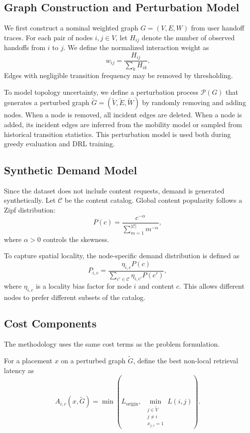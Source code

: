 \subsection{Graph Construction and Perturbation Model}

We first construct a nominal weighted graph \(G=(V,E,W)\) from user handoff traces. For each pair of nodes \(i,j \in V\), let \(H_{ij}\) denote the number of observed handoffs from \(i\) to \(j\). We define the normalized interaction weight as
\[
w_{ij} = \frac{H_{ij}}{\sum_{k} H_{ik}}.
\]
Edges with negligible transition frequency may be removed by thresholding.

To model topology uncertainty, we define a perturbation process \(\mathcal{P}(G)\) that generates a perturbed graph \(\tilde{G} = (\tilde{V}, \tilde{E}, \tilde{W})\) by randomly removing and adding nodes. When a node is removed, all incident edges are deleted. When a node is added, its incident edges are inferred from the mobility model or sampled from historical transition statistics. This perturbation model is used both during greedy evaluation and DRL training.

\subsection{Synthetic Demand Model}

Since the dataset does not include content requests, demand is generated synthetically. Let \(\mathcal{C}\) be the content catalog. Global content popularity follows a Zipf distribution:
\[
P(c) = \frac{c^{-\alpha}}{\sum_{m=1}^{|\mathcal{C}|} m^{-\alpha}},
\]
where \(\alpha > 0\) controls the skewness.

To capture spatial locality, the node-specific demand distribution is defined as
\[
P_{i,c} = \frac{\eta_{i,c} P(c)}{\sum_{c' \in \mathcal{C}} \eta_{i,c'} P(c')},
\]
where \(\eta_{i,c}\) is a locality bias factor for node \(i\) and content \(c\). This allows different nodes to prefer different subsets of the catalog.

\subsection{Cost Components}

The methodology uses the same cost terms as the problem formulation.

For a placement \(x\) on a perturbed graph \(\tilde{G}\), define the best non-local retrieval latency as
\[
A_{i,c}(x,\tilde{G})
=
\min\!\left(
L_{\text{origin}},
\;
\min_{\substack{j \in \tilde{V} \\ j \neq i \\ x_{j,c}=1}} L(i,j)
\right).
\]

